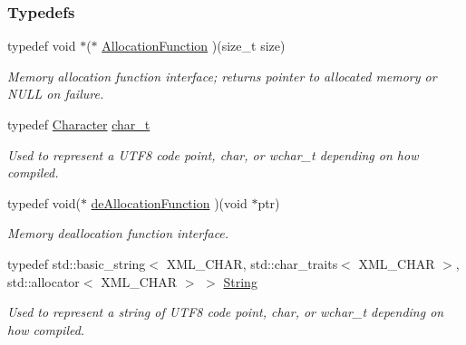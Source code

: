 \subsubsection*{Typedefs}
\begin{DoxyCompactItemize}
\item 
\hypertarget{namespacephys_1_1xml_a6d772c4cf52d017d4d6ad68ddcbd493f}{
typedef void $\ast$($\ast$ \hyperlink{namespacephys_1_1xml_a6d772c4cf52d017d4d6ad68ddcbd493f}{AllocationFunction} )(size\_\-t size)}
\label{namespacephys_1_1xml_a6d772c4cf52d017d4d6ad68ddcbd493f}

\begin{DoxyCompactList}\small\item\em Memory allocation function interface; returns pointer to allocated memory or NULL on failure. \item\end{DoxyCompactList}\item 
typedef \hyperlink{namespacephys_a3098bae5b0a3cd16eec331f766cc562b}{Character} \hyperlink{namespacephys_1_1xml_afc87705cd1c2917d87b879715a2d8f6e}{char\_\-t}
\begin{DoxyCompactList}\small\item\em Used to represent a UTF8 code point, char, or wchar\_\-t depending on how compiled. \item\end{DoxyCompactList}\item 
\hypertarget{namespacephys_1_1xml_af98b1cb6640aa712180aad89a1c776d8}{
typedef void($\ast$ \hyperlink{namespacephys_1_1xml_af98b1cb6640aa712180aad89a1c776d8}{deAllocationFunction} )(void $\ast$ptr)}
\label{namespacephys_1_1xml_af98b1cb6640aa712180aad89a1c776d8}

\begin{DoxyCompactList}\small\item\em Memory deallocation function interface. \item\end{DoxyCompactList}\item 
typedef std::basic\_\-string$<$ XML\_\-CHAR, std::char\_\-traits$<$ XML\_\-CHAR $>$, std::allocator$<$ XML\_\-CHAR $>$ $>$ \hyperlink{namespacephys_1_1xml_a4d8ca7638328d16d303e5a4c849f4704}{String}
\begin{DoxyCompactList}\small\item\em Used to represent a string of UTF8 code point, char, or wchar\_\-t depending on how compiled. \item\end{DoxyCompactList}\end{DoxyCompactItemize}
